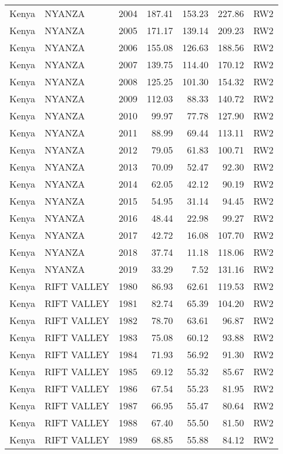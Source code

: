 \begin{longtable}{lllrrrl}
  Kenya & NYANZA & 2004 & 187.41 & 153.23 & 227.86 & RW2 \\ 
  Kenya & NYANZA & 2005 & 171.17 & 139.14 & 209.23 & RW2 \\ 
  Kenya & NYANZA & 2006 & 155.08 & 126.63 & 188.56 & RW2 \\ 
  Kenya & NYANZA & 2007 & 139.75 & 114.40 & 170.12 & RW2 \\ 
  Kenya & NYANZA & 2008 & 125.25 & 101.30 & 154.32 & RW2 \\ 
  Kenya & NYANZA & 2009 & 112.03 & 88.33 & 140.72 & RW2 \\ 
  Kenya & NYANZA & 2010 & 99.97 & 77.78 & 127.90 & RW2 \\ 
  Kenya & NYANZA & 2011 & 88.99 & 69.44 & 113.11 & RW2 \\ 
  Kenya & NYANZA & 2012 & 79.05 & 61.83 & 100.71 & RW2 \\ 
  Kenya & NYANZA & 2013 & 70.09 & 52.47 & 92.30 & RW2 \\ 
  Kenya & NYANZA & 2014 & 62.05 & 42.12 & 90.19 & RW2 \\ 
  Kenya & NYANZA & 2015 & 54.95 & 31.14 & 94.45 & RW2 \\ 
  Kenya & NYANZA & 2016 & 48.44 & 22.98 & 99.27 & RW2 \\ 
  Kenya & NYANZA & 2017 & 42.72 & 16.08 & 107.70 & RW2 \\ 
  Kenya & NYANZA & 2018 & 37.74 & 11.18 & 118.06 & RW2 \\ 
  Kenya & NYANZA & 2019 & 33.29 & 7.52 & 131.16 & RW2 \\ 
  Kenya & RIFT VALLEY & 1980 & 86.93 & 62.61 & 119.53 & RW2 \\ 
  Kenya & RIFT VALLEY & 1981 & 82.74 & 65.39 & 104.20 & RW2 \\ 
  Kenya & RIFT VALLEY & 1982 & 78.70 & 63.61 & 96.87 & RW2 \\ 
  Kenya & RIFT VALLEY & 1983 & 75.08 & 60.12 & 93.88 & RW2 \\ 
  Kenya & RIFT VALLEY & 1984 & 71.93 & 56.92 & 91.30 & RW2 \\ 
  Kenya & RIFT VALLEY & 1985 & 69.12 & 55.32 & 85.67 & RW2 \\ 
  Kenya & RIFT VALLEY & 1986 & 67.54 & 55.23 & 81.95 & RW2 \\ 
  Kenya & RIFT VALLEY & 1987 & 66.95 & 55.47 & 80.64 & RW2 \\ 
  Kenya & RIFT VALLEY & 1988 & 67.40 & 55.50 & 81.50 & RW2 \\ 
  Kenya & RIFT VALLEY & 1989 & 68.85 & 55.88 & 84.12 & RW2 \\ 

\end{longtable}
